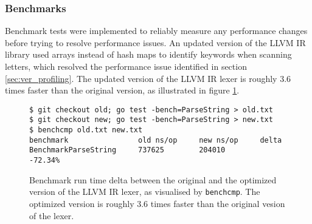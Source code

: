 
\subsubsection{Benchmarks}
\label{sec:ver_benchmarks}

Benchmark tests were implemented to reliably measure any performance changes before trying to resolve performance issues. An updated version of the LLVM IR library used arrays instead of hash maps to identify keywords when scanning letters, which resolved the performance issue identified in section \ref{sec:ver_profiling}. The updated version of the LLVM IR lexer is roughly 3.6 times faster than the original version, as illustrated in figure \ref{fig:benchmark_delta}.

\begin{figure}[htbp]
	\begin{center}
		\begin{verbatim}
$ git checkout old; go test -bench=ParseString > old.txt
$ git checkout new; go test -bench=ParseString > new.txt
$ benchcmp old.txt new.txt
benchmark                old ns/op     new ns/op     delta
BenchmarkParseString     737625        204010        -72.34%
		\end{verbatim}
		\caption{Benchmark run time delta between the original and the optimized version of the LLVM IR lexer, as visualised by \texttt{benchcmp}\protect\footnotemark. The optimized version is roughly 3.6 times faster than the original vesion of the lexer.}
		\label{fig:benchmark_delta}
	\end{center}
\end{figure}
